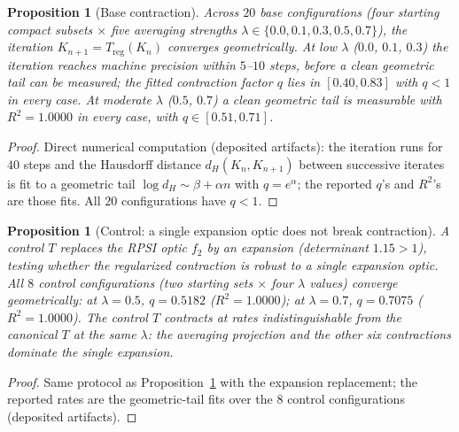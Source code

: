 \documentclass[11pt,a4paper]{article}
\theoremstyle{plain}
\newtheorem{proposition}[theorem]{Proposition}
\theoremstyle{definition}
\theoremstyle{remark}
\begin{document}
\begin{proposition}[Base contraction]\label{prop:titer-base}
Across $20$ base configurations (four starting compact subsets
$\times$ five averaging strengths
$\lambda\in\{0.0,0.1,0.3,0.5,0.7\}$), the iteration
$K_{n+1}=T_{\mathrm{reg}}(K_n)$ converges geometrically. At low
$\lambda$ ($0.0$, $0.1$, $0.3$) the iteration reaches machine
precision within $5$--$10$ steps, before a clean geometric tail
can be measured; the fitted contraction factor $q$ lies in
$[0.40,0.83]$ with $q<1$ in every case. At moderate $\lambda$
($0.5$, $0.7$) a clean geometric tail is measurable with
$R^{2}=1.0000$ in every case, with $q\in[0.51,0.71]$.
\end{proposition}

\begin{proof}
Direct numerical computation (deposited artifacts): the iteration
runs for $40$ steps and the Hausdorff distance
$d_H(K_n,K_{n+1})$ between successive iterates is fit to a
geometric tail $\log d_H\sim\beta+\alpha n$ with $q=e^{\alpha}$;
the reported $q$'s and $R^{2}$'s are those fits. All $20$
configurations have $q<1$.
\end{proof}

\begin{proposition}[Control: a single expansion optic does not
break contraction]\label{prop:titer-control}
A control $T$ replaces the RPSI optic $f_2$ by an expansion
(determinant $1.15>1$), testing whether the regularized
contraction is robust to a single expansion optic. All $8$ control
configurations (two starting sets $\times$ four $\lambda$ values)
converge geometrically: at $\lambda=0.5$,
$q=0.5182$ ($R^{2}=1.0000$); at $\lambda=0.7$, $q=0.7075$
($R^{2}=1.0000$). The control $T$ contracts at rates
indistinguishable from the canonical $T$ at the same
$\lambda$: the averaging projection and the other six
contractions dominate the single expansion.
\end{proposition}

\begin{proof}
Same protocol as Proposition~\ref{prop:titer-base} with the
expansion replacement; the reported rates are the geometric-tail
fits over the $8$ control configurations (deposited artifacts).
\end{proof}
\end{document}

